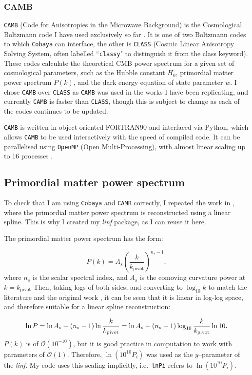 \documentclass{article}
\begin{document}
\subsubsection{CAMB}
\texttt{CAMB} (Code for Anisotropies in the Microwave Background) is the Cosmological Boltzmann code I have used exclusively so far \cite{CAMB_1, CAMB_2}. It is one of two Boltzmann codes to which \texttt{Cobaya} can interface, the other is \texttt{CLASS} (Cosmic Linear Anisotropy Solving System, often labelled ``\texttt{classy}" to distinguish it from the class keyword). These codes calculate the theoretical CMB power spectrum for a given set of cosmological parameters, such as the Hubble constant $H_0$, primordial matter power spectrum $P(k)$, and the dark energy equation of state parameter $w$. I chose \texttt{CAMB} over \texttt{CLASS} as \texttt{CAMB} was used in the works I have been replicating, and currently \texttt{CAMB} is faster than \texttt{CLASS}, though this is subject to change as each of the codes continues to be updated.

\texttt{CAMB} is written in object-oriented FORTRAN90 and interfaced via Python, which allows \texttt{CAMB} to be used interactively with the speed of compiled code. It can be parallelised using \texttt{OpenMP} (Open Multi-Processing), with almost linear scaling up to 16 processes \cite{camb_mp}. 

\subsection{Primordial matter power spectrum}
To check that I am using \texttt{Cobaya} and \texttt{CAMB} correctly, I repeated the work in \cite{Handley2019}, where the primordial matter power spectrum is reconstructed using a linear spline. This is why I created my \textit{linf} package, as I can reuse it here.

The primordial matter power spectrum has the form:

\begin{equation}
  P(k) = A_s \left(\frac{k}{k_\textrm{pivot}} \right) ^ {n_s - 1},
\end{equation}
%
where $n_s$ is the scalar spectral index, and $A_s$ is the comoving curvature power at $k=k_\textrm{pivot}$ Then, taking logs of both sides, and converting to $\log_{10}{k}$ to match the literature and the original work \cite{Handley2019}, it can be seen that it is linear in log-log space, and therefore suitable for a linear spline reconstruction:

\begin{equation}
  \ln{P} = \ln{A_s} + \left(n_s - 1\right) \ln{\frac{k}{k_\textrm{pivot}}} = \ln{A_s} + \left(n_s - 1\right) \log_{10}{\frac{k}{k_\textrm{pivot}}} \ln{10}\textrm.
\end{equation}
%
$P(k)$ is of $\mathcal{O}\left(10^{-10}\right)$, but it is good practice in computation to work with parameters of $\mathcal{O}\left(1\right)$. Therefore, $\ln{\left(10^{10}P_i\right)}$  was used as the $y$--parameter of the \textit{linf}. My code uses this scaling implicitly, i.e.\ \texttt{lnPi} refers to $\ln{\left(10^{10}P_i\right)}$.
\end{document}
